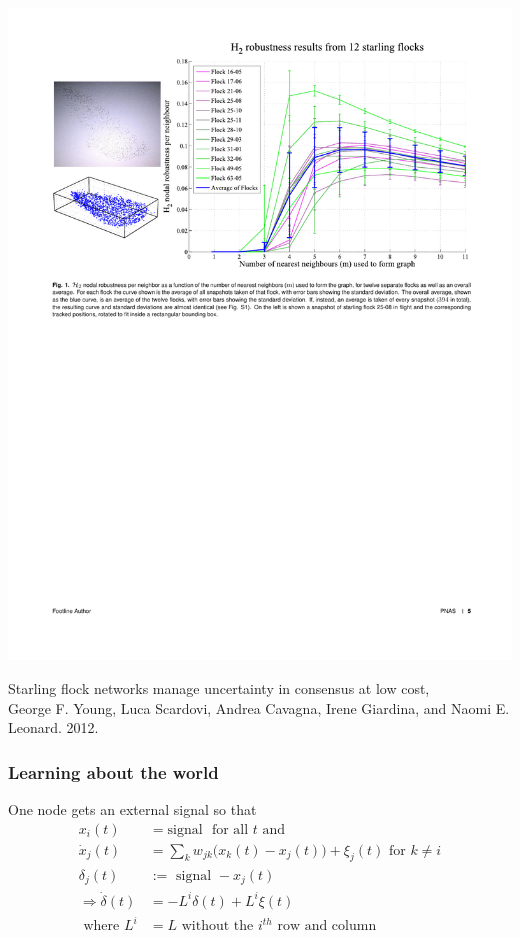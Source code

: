 \documentclass{beamer}
\begin{document}
\begin{frame}
\begin{center}
\includegraphics[width=\textwidth]{starling_robustness.pdf}
\end{center}
\vspace{30pt}\tiny{Starling flock networks manage uncertainty in consensus at low cost, \\ \vspace{-6pt} George F. Young, Luca Scardovi, Andrea Cavagna, Irene Giardina, and Naomi E. Leonard. 2012.}
\end{frame}

\begin{frame}
\frametitle{Learning about the world}
One node gets an external signal so that 
\begin{align*}
x_i(t)&=\text{signal } \text{ for all } t \text{ and }
\\ \dot{x}_j(t)&=\sum_kw_{jk}\big(x_k(t)-x_j(t)\big)+\xi_j(t) \text{ for } k\neq i
\\ \delta_j(t)&:=\text{ signal } -x_j(t)
\\ \Rightarrow \dot{\delta}(t)&=-L^i\delta(t)+L^i\xi(t) 
\\ \text{ where } L^i&=L \text{ without the $i^{th}$ row and column}
\end{align*}
\end{frame}
\end{document}
